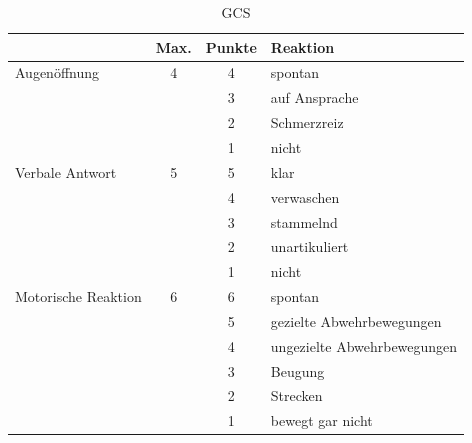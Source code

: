 \begin{table}[H]\begin{center}
\begin{tabulary}{\linewidth}{LCCL}
\toprule
~ & Max. & Punkte & Reaktion
\\\midrule
Augenöffnung & 4 & 4 & spontan
\\
 & & 3 & auf Ansprache
\\
 & & 2 & Schmerzreiz
\\
 & & 1 & nicht
\\\midrule
Verbale Antwort & 5 & 5 & klar
\\
 & & 4 & verwaschen
\\
 & & 3 & stammelnd
\\
 & & 2 & unartikuliert
\\
 & & 1 & nicht
\\\midrule
Motorische Reaktion & 6 & 6 & spontan
\\
 & & 5 & gezielte Abwehrbewegungen
\\
 & & 4 & ungezielte Abwehrbewegungen
\\
 & & 3 & Beugung
\\
 & & 2 & Strecken
\\
 & & 1  & bewegt gar nicht
\\\bottomrule
\end{tabulary}\end{center}
\caption{GCS}
\end{table}



